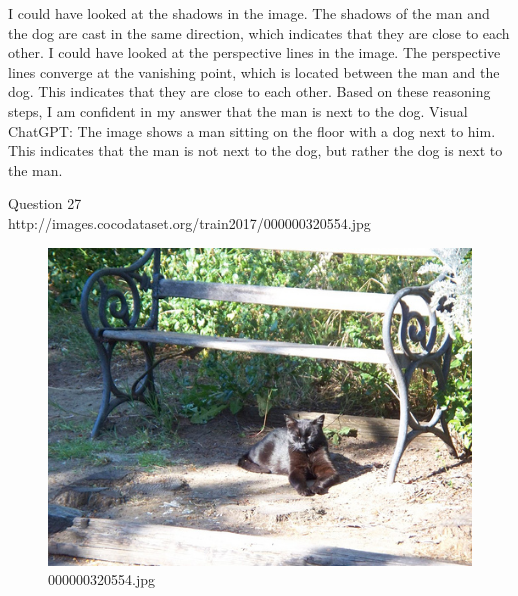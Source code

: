 \begin{enumerate}
        I could have looked at the shadows in the image. The shadows of the man and the dog are cast in the same direction, which indicates that they are close to each other.
        I could have looked at the perspective lines in the image. The perspective lines converge at the vanishing point, which is located between the man and the dog. This indicates that they are close to each other.
        Based on these reasoning steps, I am confident in my answer that the man is next to the dog.
        \subitem Visual ChatGPT: The image shows a man sitting on the floor with a dog next to him. This indicates that the man is not next to the dog, but rather the dog is next to the man.
    \end{enumerate}
Question 27\\
http://images.cocodataset.org/train2017/000000320554.jpg
    \begin{figure}[h]
        \centering
        \includegraphics[width=0.8\linewidth]{../image set/easy/000000320554.jpg}
        \caption{000000320554.jpg}
    \end{figure}
